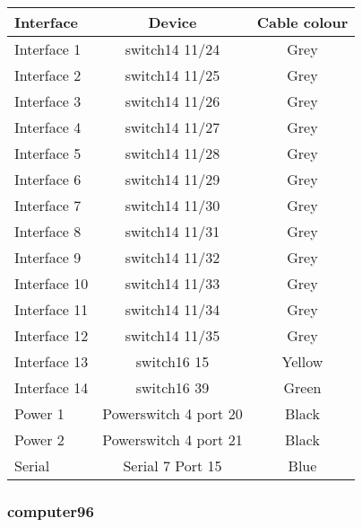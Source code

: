 \begin{table}[H]
\begin{tabular}{|l|c|c|}\hline
Interface & Device & Cable colour \\ \hline
Interface 1 & switch14 11/24 & Grey \\
Interface 2 & switch14 11/25 & Grey \\
Interface 3 & switch14 11/26 & Grey \\
Interface 4 & switch14 11/27 & Grey \\
Interface 5 & switch14 11/28 & Grey \\
Interface 6 & switch14 11/29 & Grey \\
Interface 7 & switch14 11/30 & Grey \\
Interface 8 & switch14 11/31 & Grey \\
Interface 9 & switch14 11/32 & Grey \\
Interface 10 & switch14 11/33 & Grey \\
Interface 11 & switch14 11/34 & Grey \\
Interface 12 & switch14 11/35 & Grey \\
Interface 13 & switch16 15 & Yellow \\
Interface 14 & switch16 39 & Green \\
Power 1 & Powerswitch 4 port 20 & Black \\
Power 2 & Powerswitch 4 port 21 & Black \\
Serial & Serial 7 Port 15 & Blue \\ \hline
\end{tabular}
\end{table}

\subsubsection{computer96}

